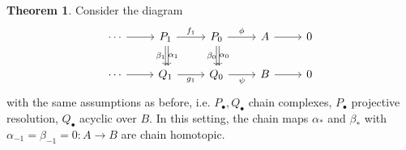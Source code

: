 \documentclass[10pt]{report}
\theoremstyle{definition}
\newtheorem{theorem}{Theorem}
\begin{document}
\begin{theorem}
Consider the diagram
$$
\begin{tikzcd}
\cdots \arrow[r] & P_1 \arrow[r, "f_1"] \arrow[d, "\alpha_1"] \arrow[d, shift left, "\beta_1"'] & P_0 \arrow[r, "\phi"] \arrow[d, "\alpha_0"] \arrow[d, shift left, "\beta_0"'] & A \arrow[r] & 0 \\
\cdots \arrow[r] & Q_1 \arrow[r, "g_1"']                      & Q_0 \arrow[r, "\psi"']                      & B \arrow[r]                     & 0
\end{tikzcd}
$$
with the same assumptions as before, i.e. $P_\bullet,Q_\bullet$ chain complexes, $P_\bullet$ projective resolution, $Q_\bullet$ acyclic over $B$. In this setting, the chain maps $\alpha_*$ and $\beta_*$ with $\alpha_{-1}=\beta_{-1}=0:A\to B$ are chain homotopic.
\end{theorem}
\end{document}
